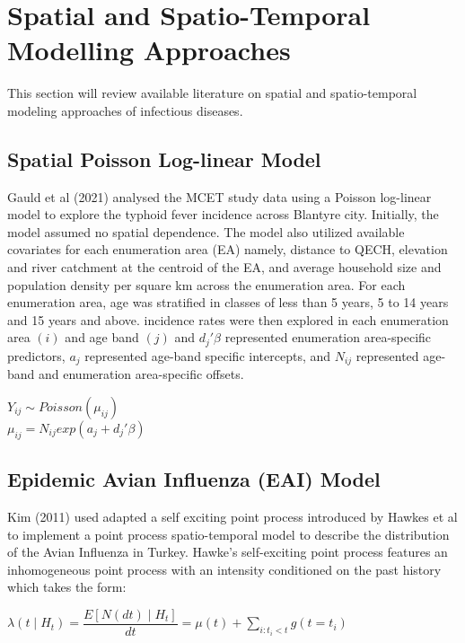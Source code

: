 \documentclass[a4paper]{thesis}
\begin{document}
\section{Spatial and Spatio-Temporal Modelling Approaches}

This section will review available literature on spatial and spatio-temporal modeling approaches of infectious diseases.

\subsection{Spatial Poisson Log-linear Model}

Gauld et al (2021) analysed the MCET study data using a Poisson log-linear model to explore the typhoid fever incidence across Blantyre city. Initially, the model assumed no spatial dependence. The model also utilized available covariates for each enumeration area (EA) namely, distance to QECH, elevation and river catchment at the centroid of the EA, and average household size and population density per square km across the enumeration area. For each enumeration area, age was stratified in classes of less than 5 years, 5 to 14 years and 15 years and above. incidence rates were then explored in each enumeration area $(i)$ and age band $(j)$ and $d_j'\beta$ represented enumeration area-specific predictors, $a_j$ represented age-band specific intercepts, and $N_{ij}$ represented age-band and enumeration area-specific offsets.\cite{Gauld2021}

\begin{center}
$Y_{ij} \sim Poisson(\mu_{ij})$ \\
$\mu_{ij} = N_{ij}exp(a_j + d_j'\beta)$
\end{center}

\subsection{Epidemic Avian Influenza (EAI) Model}

Kim (2011) used adapted a self exciting point process introduced by Hawkes et al\cite{Hawkes&Oakes1974} to implement a point process spatio-temporal model to describe the distribution of the Avian Influenza in Turkey\cite{Kim}. Hawke's self-exciting point process features an inhomogeneous point process with an intensity conditioned on the past history which takes
the form:

\begin{center}
$\lambda(t \mid H_t) = \dfrac{E\left[ N(dt) \mid H_t \right] }{dt} = \mu(t) + \sum_{i:t_i<t}g(t=t_i)$
\end{center}
\end{document}
